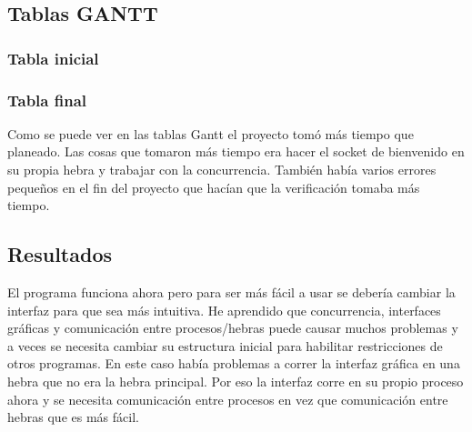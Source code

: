 \documentclass[a4paper, 12pt]{article}
\begin{document}
\subsection{Tablas GANTT}
\subsubsection{Tabla inicial}
\begin{gantt}[xunitlength=5mm]{8}{15}
\begin{ganttitle}
\end{ganttitle}
\end{gantt}

\subsubsection{Tabla final}
\begin{gantt}[xunitlength=5mm]{8}{19}
\begin{ganttitle}
\end{ganttitle}
\end{gantt}

Como se puede ver en las tablas Gantt el proyecto tomó más tiempo que planeado.
Las cosas que tomaron más tiempo era hacer el socket de bienvenido en su propia
hebra y trabajar con la concurrencia. También había varios errores pequeños en
el fin del proyecto que hacían que la verificación tomaba más tiempo.

\subsection{Resultados}
El programa funciona ahora pero para ser más fácil a usar se debería cambiar la
interfaz para que sea más intuitiva. He aprendido que concurrencia, interfaces
gráficas y comunicación entre procesos/hebras puede causar muchos problemas y a
veces se necesita cambiar su estructura inicial para habilitar restricciones de
otros programas. En este caso había problemas a correr la interfaz gráfica en una
hebra que no era la hebra principal. Por eso la interfaz corre en su propio
proceso ahora y se necesita comunicación entre procesos en vez que comunicación
entre hebras que es más fácil.
\end{document}

